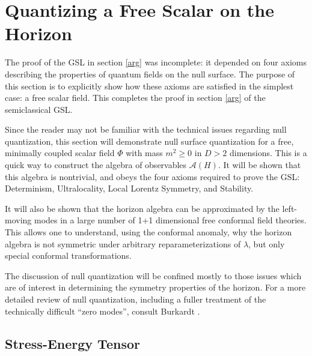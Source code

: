 \documentclass[12pt]{article}
\begin{document}
\section{Quantizing a Free Scalar on the Horizon}\label{scalar}

The proof of the GSL in section \ref{arg} was incomplete: it depended on four axioms describing the properties of quantum fields on the null surface.  The purpose of this section is to explicitly show how these axioms are satisfied in the simplest case: a free scalar field.  This completes the proof in section \ref{arg} of the semiclassical GSL.

Since the reader may not be familiar with the technical issues regarding null quantization, this section will demonstrate null surface quantization for a free, minimally coupled scalar field $\Phi$ with mass $m^2 \ge 0$ in $D > 2$ dimensions.  This is a quick way to construct the algebra of observables $\mathcal{A}(H)$.  It will be shown that this algebra is nontrivial, and obeys the four axioms required to prove the GSL: Determinism, Ultralocality, Local Lorentz Symmetry, and Stability.

It will also be shown that the horizon algebra can be approximated by the left-moving modes in a large number of 1+1 dimensional free conformal field theories.  This allows one to understand, using the conformal anomaly, why the horizon algebra is not symmetric under arbitrary reparameterizations of $\lambda$, but only special conformal transformations.

The discussion of null quantization will be confined mostly to those issues which are of interest in determining the symmetry properties of the horizon.  For a more detailed review of null quantization, including a fuller treatment of the technically difficult ``zero modes'', consult Burkardt \cite{burkardt96}.

\subsection{Stress-Energy Tensor}
\end{document}
